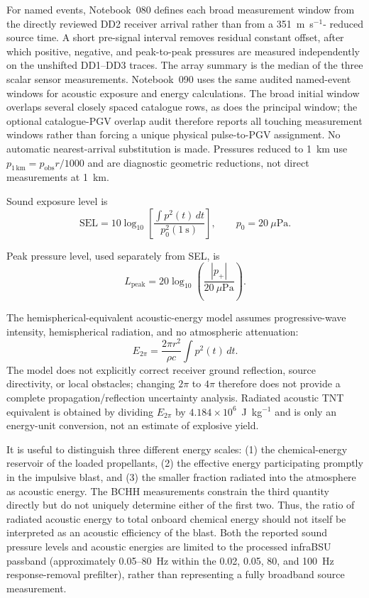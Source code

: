 \documentclass[]{seismica}
\begin{document}
For named events, Notebook~080 defines each broad measurement window from the
directly reviewed DD2 receiver arrival rather than from a 351~m~s$^{-1}$-
reduced source time. A short pre-signal interval removes residual constant
offset, after which positive, negative, and peak-to-peak pressures are measured
independently on the unshifted DD1--DD3 traces. The array summary is the median
of the three scalar sensor measurements. Notebook~090 uses the same audited
named-event windows for acoustic exposure and energy calculations. The broad
initial window overlaps several closely spaced catalogue rows, as does the
principal window; the optional catalogue-PGV overlap audit therefore reports
all touching measurement windows rather than forcing a unique physical
pulse-to-PGV assignment. No automatic nearest-arrival substitution is made.
Pressures reduced to 1~km use
$p_{1\,\mathrm{km}}=p_{\mathrm{obs}}r/1000$ and are diagnostic geometric
reductions, not direct measurements at 1~km.

Sound exposure level is
\begin{equation}
 \mathrm{SEL}=10\log_{10}\left[
 \frac{\int p^2(t)\,dt}{p_0^2(1~\mathrm{s})}\right],
 \qquad p_0=20~\mu\mathrm{Pa}.
\end{equation}

Peak pressure level, used separately from SEL, is
\begin{equation}
 L_{\mathrm{peak}}=
 20\log_{10}\left(\frac{|p_+|}{20~\mu\mathrm{Pa}}\right).
\end{equation}

The hemispherical-equivalent acoustic-energy model assumes progressive-wave
intensity, hemispherical radiation, and no atmospheric attenuation:
\begin{equation}
 E_{2\pi}=\frac{2\pi r^2}{\rho c}\int p^2(t)\,dt.
\end{equation}
The model does not explicitly correct receiver ground reflection, source
directivity, or local obstacles; changing $2\pi$ to $4\pi$ therefore does not
provide a complete propagation/reflection uncertainty analysis. Radiated
acoustic TNT equivalent is obtained by dividing $E_{2\pi}$ by
$4.184\times10^6$~J~kg$^{-1}$ and is only an energy-unit conversion, not an
estimate of explosive yield.

It is useful to distinguish three different energy scales: (1) the
chemical-energy reservoir of the loaded propellants, (2) the effective energy
participating promptly in the impulsive blast, and (3) the smaller fraction
radiated into the atmosphere as acoustic energy. The BCHH measurements
constrain the third quantity directly but do not uniquely determine either of
the first two. Thus, the ratio of radiated acoustic energy to total onboard
chemical energy should not itself be interpreted as an acoustic efficiency of
the blast. Both the reported sound pressure levels and acoustic energies are
limited to the processed infraBSU passband (approximately 0.05--80~Hz within
the 0.02, 0.05, 80, and 100~Hz response-removal prefilter), rather than
representing a fully broadband source measurement.
\end{document}
